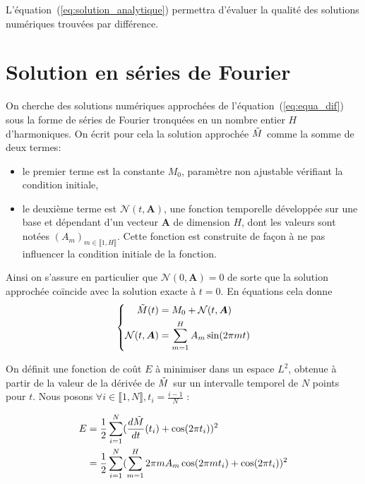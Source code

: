 \documentclass[12pt]{report}
\begin{document}
L'équation~(\ref{eq:solution_analytique}) permettra d'évaluer la qualité des solutions numériques trouvées par différence.

\section{Solution en séries de Fourier}
\label{sec:sol_ser_fourier_1d}

On cherche des solutions numériques approchées de l'équation~(\ref{eq:equa_dif}) sous la forme de séries de Fourier tronquées en un nombre entier $H$ d'harmoniques.
On écrit pour cela la solution approchée $\Tilde{M}$ comme la somme de deux termes: 
\begin{itemize}
    \item le premier terme est la constante $M_0$, paramètre non ajustable vérifiant la condition initiale,
    \item le deuxième terme est $\mathcal{N}(t,\bm{A})$, une fonction temporelle développée sur une base et dépendant d'un vecteur ${\bm A}$ de dimension $H$, dont les valeurs sont notées $(A_m)_{m\in \llbracket 1,H \rrbracket}$.
    Cette fonction est construite de façon à ne pas influencer la condition initiale de la fonction.
\end{itemize}
Ainsi on s'assure en particulier que $\mathcal{N}(0,\bm{A})=0$ de sorte que la solution approchée coïncide avec la solution exacte à $t=0$. 
En équations cela donne
\begin{equation}
    \left\{
    \begin{aligned}
        \Tilde{M}(t)            & = M_0 + {\mathcal{N}}(t,\bm{A})     \\
        {\mathcal{N}}(t,\bm{A}) & = \sum_{m=1}^{H} A_m \sin(2\pi m t)
    \end{aligned}
    \right.
    \label{eq:solution_fourier}
\end{equation}

On définit une fonction de coût $E$ à minimiser dans un espace $L^2$, obtenue à partir de la valeur de la dérivée de $\Tilde{M}$ sur un intervalle temporel de $N$ points pour $t$. 
Nous posons $\forall i \in\llbracket 1,N \rrbracket, t_i = \frac{i-1}{N} $ :

\begin{equation}
    \begin{aligned}
        E & = \frac{1}{2}\sum_{i=1}^{N} (\frac{d\Tilde{M}}{dt}(t_i) +\cos(2\pi t_i))^2               \\
          & = \frac{1}{2}\sum_{i=1}^{N}(\sum_{m=1}^{H} 2\pi m A_m \cos(2\pi m t_i)+\cos(2\pi t_i))^2
    \end{aligned}
    \label{eq:fonction_erreur}
\end{equation}
\end{document}
